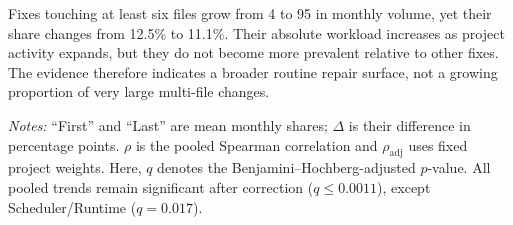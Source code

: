 Fixes touching at least six files grow from 4 to 95 in monthly volume, yet their share changes from 12.5\% to 11.1\%. Their absolute workload increases as project activity expands, but they do not become more prevalent relative to other fixes. The evidence therefore indicates a broader routine repair surface, not a growing proportion of very large multi-file changes.


\begin{table}[t]
    \centering
    \caption{Weighted architectural-layer changes over time.}
    \label{tab:monthly-layer-trends}
    \scriptsize
    \setlength{\tabcolsep}{3pt}
    \vspace{2pt}

    \begin{minipage}{\columnwidth}
        \scriptsize
        \emph{Notes:} ``First'' and ``Last'' are mean monthly shares; $\Delta$ is their difference in percentage points. $\rho$ is the pooled Spearman correlation and $\rho_{\mathrm{adj}}$ uses fixed project weights. Here, $q$ denotes the Benjamini--Hochberg-adjusted $p$-value. All pooled trends remain significant after correction ($q\leq0.0011$), except Scheduler/Runtime ($q=0.017$).
    \end{minipage}
\end{table}

